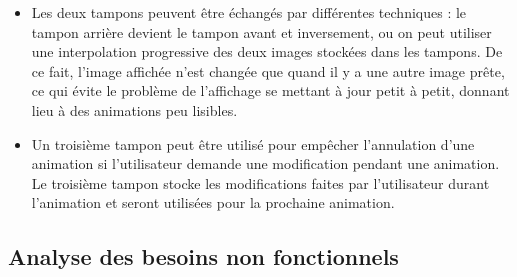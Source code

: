 \documentclass[12pt]{article}
\begin{document}
\begin{itemize}
\begin{itemize}
	\item Les deux tampons peuvent être échangés par différentes techniques : le tampon arrière devient le tampon avant et
	inversement, ou on peut utiliser une interpolation progressive des deux images stockées dans les tampons. De ce fait, l'image affichée n'est 
changée que quand il y a une autre image prête, ce qui évite le problème de l'affichage se mettant à jour petit à petit, donnant lieu à des animations 
peu lisibles.
	\item Un troisième tampon peut être utilisé pour empêcher l'annulation d'une animation si l'utilisateur demande une modification pendant une
	animation. Le troisième tampon stocke les modifications faites par l'utilisateur durant l'animation et seront utilisées pour la prochaine 
animation.
	\end{itemize}
\end{itemize}


\subsection{Analyse des besoins non fonctionnels}
\end{document}
